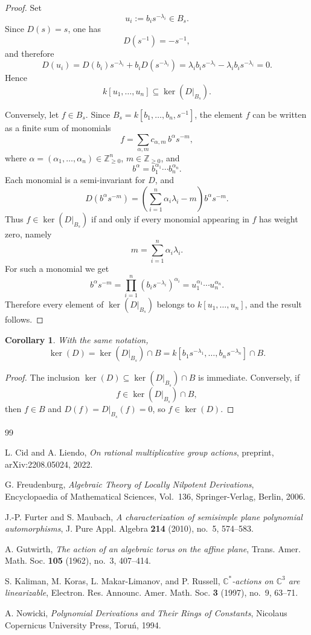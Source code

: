 \documentclass[12pt]{amsart}
\newtheorem{corollary}[theorem]{Corollary}
\newcommand{\Z}{\mathbb Z}
\begin{document}
\begin{proof}
Set
\[
u_i:=b_i s^{-\lambda_i}\in B_s.
\]
Since $D(s)=s$, one has
\[
D(s^{-1})=-s^{-1},
\]
and therefore
\[
D(u_i)=D(b_i)s^{-\lambda_i}+b_iD(s^{-\lambda_i})
=\lambda_i b_i s^{-\lambda_i}-\lambda_i b_i s^{-\lambda_i}=0.
\]
Hence
\[
k[u_1,\dots,u_n]\subseteq \ker(D|_{B_s}).
\]

Conversely, let $f\in B_s$. Since $B_s=k[b_1,\dots,b_n,s^{-1}]$,
the element $f$ can be written as a finite sum of monomials
\[
f=\sum_{\alpha,m} c_{\alpha,m}\, b^\alpha s^{-m},
\]
where $\alpha=(\alpha_1,\dots,\alpha_n)\in \Z_{\ge 0}^n$, $m\in\Z_{\ge 0}$, and
\[
b^\alpha=b_1^{\alpha_1}\cdots b_n^{\alpha_n}.
\]
Each monomial is a semi-invariant for $D$, and
\[
D(b^\alpha s^{-m})
=
\left(\sum_{i=1}^n \alpha_i\lambda_i-m\right)b^\alpha s^{-m}.
\]
Thus $f\in \ker(D|_{B_s})$ if and only if every monomial appearing in $f$ has weight zero, namely
\[
m=\sum_{i=1}^n \alpha_i\lambda_i.
\]
For such a monomial we get
\[
b^\alpha s^{-m}
=
\prod_{i=1}^n (b_i s^{-\lambda_i})^{\alpha_i}
=
u_1^{\alpha_1}\cdots u_n^{\alpha_n}.
\]
Therefore every element of $\ker(D|_{B_s})$ belongs to $k[u_1,\dots,u_n]$, and the result follows.
\end{proof}

\begin{corollary}\label{cor:kernel-intersection}
With the same notation,
\[
\ker(D)=\ker(D|_{B_s})\cap B
=
k\!\left[b_1s^{-\lambda_1},\dots,b_ns^{-\lambda_n}\right]\cap B.
\]
\end{corollary}

\begin{proof}
The inclusion $\ker(D)\subseteq \ker(D|_{B_s})\cap B$
is immediate. Conversely, if
\[
f\in \ker(D|_{B_s})\cap B,
\]
then $f\in B$ and
$D(f)=D|_{B_s}(f)=0$,
so $f\in \ker(D)$.
\end{proof}

\begin{thebibliography}{99}

L. Cid and A. Liendo,
\emph{On rational multiplicative group actions},
preprint, arXiv:2208.05024, 2022.

G. Freudenburg,
\emph{Algebraic Theory of Locally Nilpotent Derivations},
Encyclopaedia of Mathematical Sciences, Vol.~136,
Springer-Verlag, Berlin, 2006.

J.-P. Furter and S. Maubach,
\emph{A characterization of semisimple plane polynomial automorphisms},
J. Pure Appl. Algebra \textbf{214} (2010), no.~5, 574--583.

A. Gutwirth,
\emph{The action of an algebraic torus on the affine plane},
Trans. Amer. Math. Soc. \textbf{105} (1962), no.~3, 407--414.

S. Kaliman, M. Koras, L. Makar-Limanov, and P. Russell,
\emph{{$\mathbb{C}^*$}-actions on {$\mathbb{C}^3$} are linearizable},
Electron. Res. Announc. Amer. Math. Soc. \textbf{3} (1997), no.~9, 63--71.

A. Nowicki,
\emph{Polynomial Derivations and Their Rings of Constants},
Nicolaus Copernicus University Press, Toru{\'n}, 1994.

\end{thebibliography}
\end{document}
